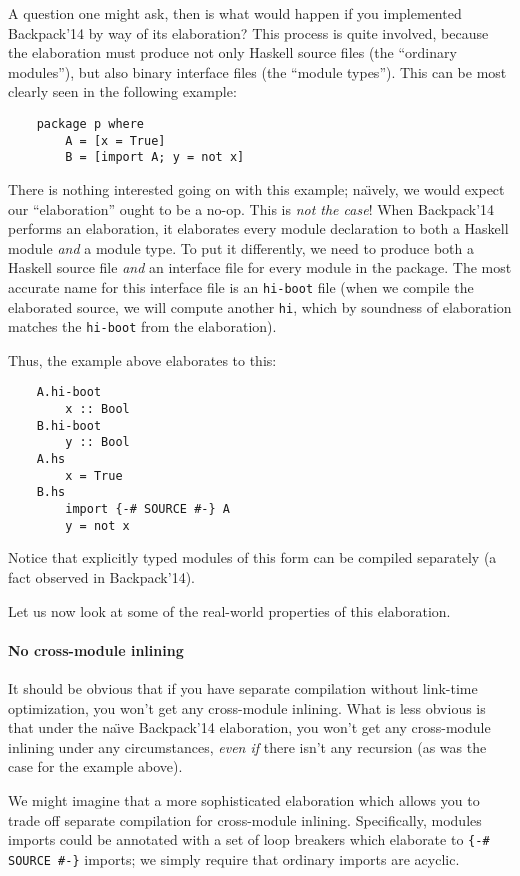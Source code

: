 A question one might ask, then is what would happen if you implemented
Backpack'14 by way of its elaboration?  This process is quite
involved, because the elaboration must produce not only Haskell source
files (the ``ordinary modules''), but also binary interface files (the
``module types'').  This can be most clearly seen in the following
example:

\begin{verbatim}
    package p where
        A = [x = True]
        B = [import A; y = not x]
\end{verbatim}

\noindent
There is nothing interested going on with this example; na\"\i vely,
we would expect our ``elaboration'' ought to be a no-op.  This
is \emph{not the case}!  When Backpack'14 performs an elaboration,
it elaborates every module declaration to both a Haskell module
\emph{and} a module type.  To put it differently, we need to produce
both a Haskell source file \emph{and} an interface file for every
module in the package.  The most accurate name for this interface
file is an \verb|hi-boot| file (when we compile the elaborated source,
we will compute another \verb|hi|, which by soundness of elaboration
matches the \verb|hi-boot| from the elaboration).

Thus, the example above elaborates to this:

\begin{verbatim}
    A.hi-boot
        x :: Bool
    B.hi-boot
        y :: Bool
    A.hs
        x = True
    B.hs
        import {-# SOURCE #-} A
        y = not x
\end{verbatim}

\noindent
Notice that explicitly typed modules of this form can be compiled
separately (a fact observed in Backpack'14).

Let us now look at some of the real-world properties of this
elaboration.

\paragraph{No cross-module inlining}  It should be obvious that
if you have separate compilation without link-time optimization,
you won't get any cross-module inlining.  What is less obvious is
that under the na\"\i ve Backpack'14 elaboration, you won't get any
cross-module inlining under any circumstances, \emph{even if} there
isn't any recursion (as was the case for the example above).

We might imagine that a more sophisticated elaboration which
allows you to trade off separate compilation for cross-module
inlining.  Specifically, modules imports could be annotated with a
set of loop breakers which elaborate to \verb|{-# SOURCE #-}|
imports; we simply require that ordinary imports are acyclic.

